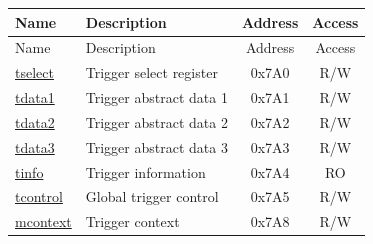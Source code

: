 \begin{longtable}{ | p{4.0cm} | p{8.4cm} | c | c| }
\hline\rowcolor{lightgray}
Name & Description & Address & Access \\ \hline
\endfirsthead
\hline
\rowcolor{lightgray}
Name & Description & Address & Access  \\
\hline
\endhead
\endfoot
\hyperref[regdesc:TSELECT]{tselect} & Trigger select register & 0x7A0 & R/W \\\hline
\hyperref[regdesc:TDATA1]{tdata1} & Trigger abstract data 1 & 0x7A1 & R/W \\\hline
\hyperref[regdesc:TDATA2]{tdata2} & Trigger abstract data 2 & 0x7A2 & R/W \\\hline
\hyperref[regdesc:TDATA3]{tdata3} & Trigger abstract data 3 & 0x7A3 & R/W \\\hline
\hyperref[regdesc:TINFO]{tinfo} & Trigger information & 0x7A4 & RO \\\hline
\hyperref[regdesc:TCONTROL]{tcontrol} & Global trigger control & 0x7A5 & R/W \\\hline
\hyperref[regdesc:MCONTEXT]{mcontext} & Trigger context & 0x7A8 & R/W \\\hline
\end{longtable}
